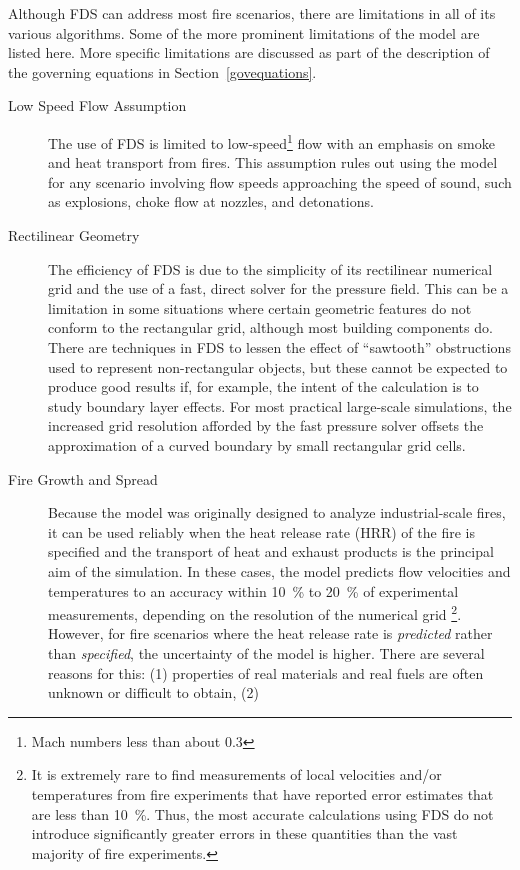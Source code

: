 \documentclass[11pt]{book}
\begin{document}
Although FDS can address most fire scenarios, there are limitations in all of its various algorithms. Some of the more prominent limitations of the
model are listed here. More specific limitations are discussed as part of the description of the governing equations in Section~\ref{govequations}.
\begin{description}
\item[Low Speed Flow Assumption] The use of FDS is limited to low-speed\footnote{Mach numbers less than about 0.3} flow
with an emphasis on smoke and heat transport from fires. This assumption rules out using the model for any scenario involving flow speeds approaching
the speed of sound, such as explosions, choke flow at nozzles, and detonations.
\item[Rectilinear Geometry] The efficiency of FDS is due to the simplicity of its rectilinear numerical grid and the
use of a fast, direct solver for the pressure field. This can be a limitation in some situations where certain geometric features do not conform to
the rectangular grid, although most building components do. There are techniques in FDS to lessen the effect of ``sawtooth'' obstructions used to
represent non-rectangular objects, but these cannot be expected to produce good results if, for example, the intent of the calculation is to study
boundary layer effects. For most practical large-scale simulations, the increased grid resolution afforded by the fast pressure solver offsets the
approximation of a curved boundary by small rectangular grid cells.
\item[Fire Growth and Spread]
Because the model was originally designed to analyze industrial-scale fires, it can be used reliably when the heat release rate (HRR) of the fire is
specified and the transport of heat and exhaust products is the principal aim of the simulation. In these cases, the model predicts flow velocities
and temperatures to an accuracy within 10~\% to 20~\% of experimental measurements, depending on the resolution of the numerical grid \footnote{It is
extremely rare to find measurements of local velocities and/or temperatures from fire experiments that have reported error estimates that are less
than 10~\%. Thus, the most accurate calculations using FDS do not introduce significantly greater errors in these quantities than the vast majority
of fire experiments.}. However, for fire scenarios where the heat release rate is {\em predicted} rather than {\em specified}, the uncertainty of the
model is higher. There are several reasons for this: (1) properties of real materials and real fuels are often unknown or difficult to obtain, (2)

\end{description}
\end{document}
